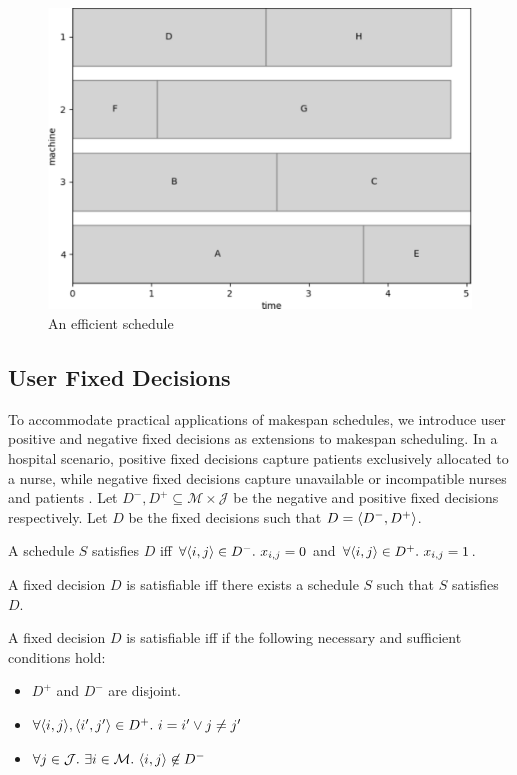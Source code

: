 \begin{figure}[H]
	\begin{center}
		\includegraphics[width=.8\linewidth]{figures/makespan_efficient.pdf}	
	\end{center}
	\caption{An efficient schedule}
\end{figure}

\subsection{User Fixed Decisions}
\label{fixeddecisions}

To accommodate practical applications of makespan schedules, we introduce user positive and negative fixed decisions as extensions to makespan scheduling. In a hospital scenario, positive fixed decisions capture patients exclusively allocated to a nurse, while negative fixed decisions capture unavailable or incompatible nurses and patients \cite{aes}. Let $D^-,D^+\subseteq\mathcal{M}\times\mathcal{J}$ be the negative and positive fixed decisions respectively. Let $D$ be the fixed decisions such that $D=\langle{D^-},{D^+}\rangle$.

\begin{definition}
	A schedule $S$ satisfies $D$ iff $\forall\pair{i}{j}\in D^-.\ x_{i,j}=0$ and $\forall \langle{i},{j}\rangle\in D^+.\ x_{i,j}=1$.
\end{definition}

\begin{definition}
	A fixed decision $D$ is satisfiable iff there exists a schedule $S$ such that $S$ satisfies $D$. 
\end{definition}

A fixed decision $D$ is satisfiable iff if the following necessary and sufficient conditions hold:
\begin{itemize}
	\item$D^+$ and $D^-$ are disjoint.
	\item$\forall\langle{i},{j}\rangle,\langle{i'},{j'}\rangle\in D^+.\ i=i'\lor j\neq j'$
	\item$\forall j\in\mathcal{J}.\ \exists i\in\mathcal{M}.\ \langle{i},{j}\rangle\not\in D^-$
\end{itemize}


